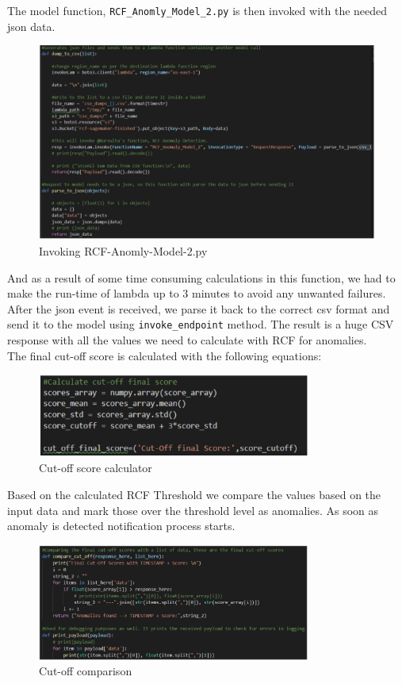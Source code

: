 The model function, \verb|RCF_Anomly_Model_2.py| is then invoked with the needed json data. 
\begin{figure}[h]

    \centering
    \includegraphics[width=1\textwidth]{images/json-generator.png}
    \caption{Invoking RCF-Anomly-Model-2.py}
    \label{fig:json_generator}
\end{figure}
And as a result of some time consuming calculations in this function, we had to make the run-time of lambda up to 3 minutes to avoid any unwanted failures.\\
After the json event is received, we parse it back to the correct csv format and send it to the model using \verb|invoke_endpoint| method. The result is a huge CSV response with all the values we need to calculate with RCF for anomalies.\\
The final cut-off score is calculated with the following equations:
\begin{figure}[h!]
    \centering
    \includegraphics[width=0.8\textwidth]{images/cutt-off-calculator.png}
    \caption{Cut-off score calculator}
    \label{fig:cut_off_calculator}
\end{figure}
Based on the calculated RCF Threshold we compare the values based on the input data and mark those over the threshold level as anomalies. As soon as anomaly is detected notification process starts.\\
\begin{figure}[h!]
    \centering
    \includegraphics[width=0.8\textwidth]{images/cutt-off-comparison.png}
    \caption{Cut-off comparison}
    \label{fig:cut_off_comparison}
\end{figure}
